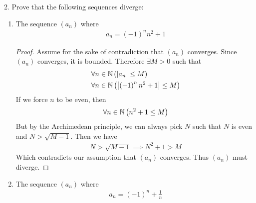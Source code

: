 2. Prove that the following sequences diverge:
\begin{enumerate}
	\item The sequence $\left( a_n \right) $ where 
		\begin{align}
			a_n = \left( -1 \right)^{n} n^{2} + 1
		\end{align}

		


	\begin{proof}
			Assume for the sake of contradiction that $\left( a_n \right) $ converges. Since $\left( a_n \right) $ converges, it is bounded. Therefore $\exists M > 0$ such that 
			\begin{align}
				&\forall n \in \mathbb{N}\left( \left|a_n\right| \le M \right) \\	
				&\forall n \in \mathbb{N} \left( \left|\left( -1 \right)^{n} n^{2} + 1 \right| \le M\right) 
			\end{align}
			If we force $n$ to be even, then
			\begin{align}
				\forall n \in \mathbb{N} \left( n^{2} + 1 \le M \right) 
			\end{align}
			But by the Archimedean principle, we can always pick $N$ such that $N$ is even and $N > \sqrt{M - 1} $. Then we have
			\begin{align}
				N > \sqrt{M - 1} \implies N^{2} + 1 > M 	
			\end{align}
			Which contradicts our assumption that $\left( a_n \right) $ converges. Thus $\left( a_n \right) $ must diverge.

	\end{proof}






	\item The sequence $\left( a_n \right)$ where
		\begin{align}
			a_n = \left( -1 \right)^{n} + \frac{1}{n}
		\end{align}




\end{enumerate}
